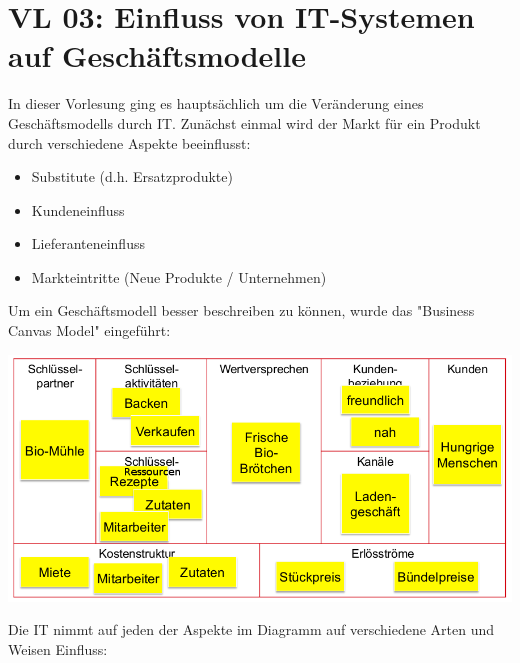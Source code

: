 \section{VL 03: Einfluss von IT-Systemen auf Geschäftsmodelle}

In dieser Vorlesung ging es hauptsächlich um die Veränderung eines Geschäftsmodells durch IT. Zunächst einmal wird der Markt für ein Produkt durch verschiedene Aspekte beeinflusst:

\begin{itemize}

    \item Substitute (d.h. Ersatzprodukte)

    \item Kundeneinfluss

    \item Lieferanteneinfluss

    \item Markteintritte (Neue Produkte / Unternehmen)

\end{itemize}

Um ein Geschäftsmodell besser beschreiben zu können, wurde das "Business Canvas Model" eingeführt:

\includegraphics[scale=0.5]{BCM.png}

\newpage

Die IT nimmt auf jeden der Aspekte im Diagramm auf verschiedene Arten und Weisen Einfluss:

